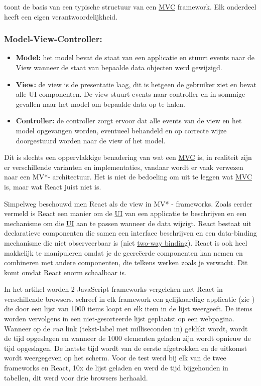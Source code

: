 	 toont de basis van een typische structuur van een \hyperref[mvc]{MVC} framework. Elk onderdeel heeft een eigen verantwoordelijkheid.
	
	\subsubsection*{Model-View-Controller:}
	\begin{itemize}
		\item \textbf{Model:} het model bevat de staat van een applicatie en stuurt events naar de View wanneer de staat van bepaalde data objecten werd gewijzigd.
		\item \textbf{View:} de view is de presentatie laag, dit is hetgeen de gebruiker ziet en bevat alle UI componenten. De view stuurt events naar controller en in sommige gevallen naar het model om bepaalde data op te halen.
		\item \textbf{Controller:} de controller zorgt ervoor dat alle events van de view en het model opgevangen worden, eventueel behandeld en op correcte wijze doorgestuurd worden naar de view of het model.
	\end{itemize}
	
	Dit is slechts een oppervlakkige benadering van wat een \hyperref[mvc]{MVC} is, in realiteit zijn er verschillende varianten en implementaties, vandaar wordt er vaak verwezen naar een MV*- architectuur. Het is niet de bedoeling om uit te leggen wat \hyperref[mvc]{MVC} is, maar wat React juist niet is.
	
	Simpelweg beschouwd men React als de view in MV* - frameworks. Zoals eerder vermeld is React een manier om de \hyperref[ui]{UI} van een applicatie te beschrijven en een mechanisme om die \hyperref[ui]{UI} aan te passen wanneer de data wijzigt. React bestaat uit declaratieve componenten die samen een interface beschrijven en een data-binding mechanisme die niet observeerbaar is (niet \hyperref[twdb]{two-way binding}). React is ook heel makkelijk te manipuleren omdat je de gecreëerde componenten kan nemen en combineren met andere componenten, die telkens werken zoals je verwacht. Dit komt omdat React enorm schaalbaar is.
	
	In het artikel \cite{Harrington:React} worden 2 JavaScript frameworks vergeleken met React in verschillende browsers. \citeauthor{Harrington:React} schreef in elk framework een gelijkaardige applicatie (zie ) die door een lijst van 1000 items loopt en elk item in de lijst weergeeft. De items worden vervolgens in een niet-gesorteerde lijst geplaatst op een webpagina. Wanneer op de \emph{run} link (tekst-label met milliseconden in) geklikt wordt, wordt de tijd opgeslagen en wanneer de 1000 elementen geladen zijn wordt opnieuw de tijd opgeslagen. De laatste tijd wordt van de eerste afgetrokken en de uitkomst wordt weergegeven op het scherm. Voor de test werd bij elk van de twee frameworks en React, 10x de lijst geladen en werd de tijd bijgehouden in tabellen, dit werd voor drie browsers herhaald.
	
